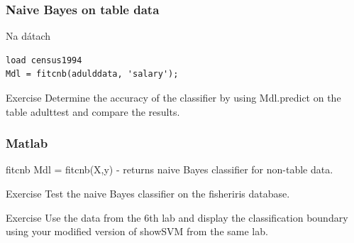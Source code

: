 \documentclass{beamer}
\begin{document}
\begin{frame}[fragile]
\frametitle{Naive Bayes on table data}

\begin{block}{Na dátach}
\begin{verbatim}
load census1994
Mdl = fitcnb(adulddata, 'salary');\end{verbatim}
\end{block}

\begin{block}{Exercise}
Determine the accuracy of the classifier by using Mdl.predict on the table adulttest and compare the results.
\end{block}
\end{frame}

\begin{frame}
\frametitle{Matlab}
\begin{block}{fitcnb}
Mdl = fitcnb(X,y) - returns naive Bayes classifier for non-table data.
\end{block}

\begin{block}{Exercise}
Test the naive Bayes classifier on the fisheriris database.
\end{block}

\begin{block}{Exercise}
Use the data from the 6th lab and display the classification boundary using your modified version of showSVM from the same lab.
\end{block}
\end{frame}
\end{document}

